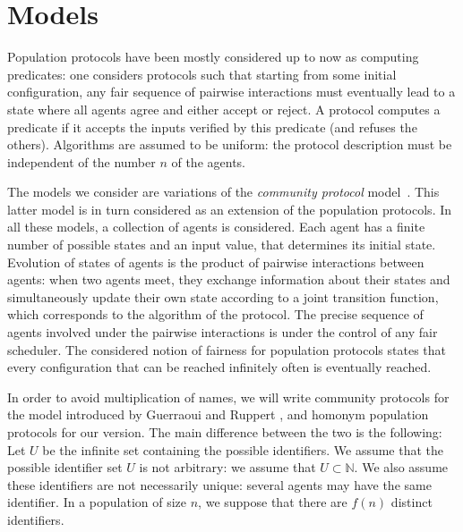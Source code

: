 \documentclass[UKenglish]{llncs}
\newcommand\N{\mathbb{N}}
\begin{document}
\section{Models}
 \label{sec:2}

Population protocols have been mostly considered up to now as computing predicates:
one considers protocols such that starting from some initial
configuration, any fair sequence of pairwise interactions must
eventually lead to a state where all agents agree and either accept
or reject. A protocol computes a predicate if it accepts the inputs
verified by this predicate (and refuses the others).
Algorithms are assumed to be uniform: the protocol description must be 
independent of the number $n$ of the agents.

The models we consider are variations of the {\em community
  protocol} model~\cite{guerraoui2009names}. This latter model is in
turn   considered as an extension of the population protocols.
In all these models, a collection of
agents is considered. Each agent has a
finite number of possible states and an input value, that
determines  its initial state. Evolution of states of agents is the
product of pairwise interactions between agents: when two agents meet,
they exchange information about their states and simultaneously update
their own state according to a joint transition function, which
corresponds to the algorithm of the protocol. The precise
sequence of agents involved under the pairwise interactions is 
under the control of any fair scheduler.
The considered
notion of fairness for population protocols states that every 
configuration that can be reached infinitely often is eventually
reached.






In order to avoid multiplication of names, we will write community protocols for the
 model introduced by Guerraoui and Ruppert \cite{guerraoui2009names}, and homonym population protocols
for our version. 
The main difference between the two is the following: 
Let $U$ be the infinite set containing the possible
identifiers. 
We assume that the possible identifier set $U$ is not 
arbitrary: we assume that $U \subset \N$. 
We also assume these  identifiers are not necessarily
unique: several agents may have the same  identifier.
In a population of size $n$, we suppose that there are $f(n)$ distinct identifiers. 
\end{document}
